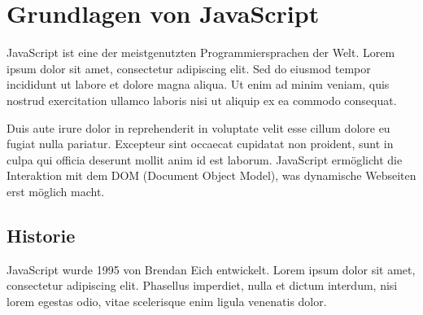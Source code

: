 \section{Grundlagen von JavaScript}
\label{sec:grundlagen}

JavaScript ist eine der meistgenutzten Programmiersprachen der Welt. Lorem ipsum dolor sit amet, consectetur adipiscing elit. Sed do eiusmod tempor incididunt ut labore et dolore magna aliqua. Ut enim ad minim veniam, quis nostrud exercitation ullamco laboris nisi ut aliquip ex ea commodo consequat. 

Duis aute irure dolor in reprehenderit in voluptate velit esse cillum dolore eu fugiat nulla pariatur. Excepteur sint occaecat cupidatat non proident, sunt in culpa qui officia deserunt mollit anim id est laborum. JavaScript ermöglicht die Interaktion mit dem DOM (Document Object Model), was dynamische Webseiten erst möglich macht.

\subsection{Historie}
JavaScript wurde 1995 von Brendan Eich entwickelt. Lorem ipsum dolor sit amet, consectetur adipiscing elit. Phasellus imperdiet, nulla et dictum interdum, nisi lorem egestas odio, vitae scelerisque enim ligula venenatis dolor.
\parencite{guha2010essence}